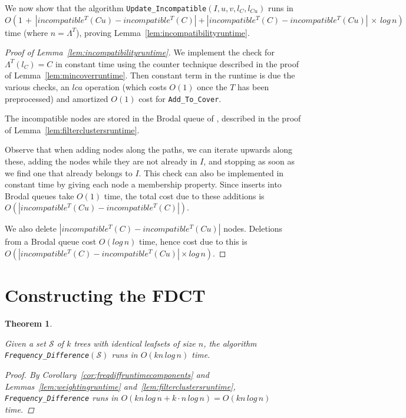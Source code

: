 \documentclass{article}
\newcommand{\leafset}{\Lambda}
\newtheorem{freqdiffruntime}[incompatibility]{Theorem}
\begin{document}
    We now show that the algorithm \texttt{Update\_Incompatible}$(I, u, v, l_C, l_{Cu})$ runs in $O(1\, +\, |incompatible^{T}(Cu) - incompatible^{T}(C)| + |incompatible^{T}(C) - incompatible^{T}(Cu)|\,\times\,log\,n)$ time (where $n = \leafset^{T}$), proving Lemma~\ref{lem:incompatibilityruntime}.

    \begin{proof}[Proof of Lemma~\ref{lem:incompatibilityruntime}]
        We implement the check for $\leafset^{T}(l_C) = C$ in constant time using the counter technique described in the proof of Lemma~\ref{lem:mincoverruntime}. Then constant term in the runtime is due the various checks, an $lca$ operation (which costs $O(1)$ once the $T$ has been preprocessed) and amortized $O(1)$ cost for \texttt{Add\_To\_Cover}.

        The incompatible nodes are stored in the Brodal queue of \cite{brodal1995fast}, described in the proof of Lemma~\ref{lem:filterclustersruntime}.

        Observe that when adding nodes along the paths, we can iterate upwards along these, adding the nodes while they are not already in $I$, and stopping as soon as we find one that already belongs to $I$. This check can also be implemented in constant time by giving each node a membership property. Since inserts into Brodal queues take $O(1)$ time, the total cost due to these additions is $O(|incompatible^{T}(Cu) - incompatible^{T}(C)|)$.

        We also delete $|incompatible^{T}(C) - incompatible^{T}(Cu)|$ nodes. Deletions from a Brodal queue cost $O(log\,n)$ time, hence cost due to this is $O(|incompatible^{T}(C) - incompatible^{T}(Cu)| \times log\,n)$.
    \end{proof}

    \section{Constructing the FDCT}
    \label{sec:freqdiffconstruction}

    \begin{freqdiffruntime}
        \label{theorem:freqdiffruntime}

        Given a set $\mathcal{S}$ of $k$ trees with identical leafsets of size $n$, the algorithm \texttt{Frequency\_Difference}$(\mathcal{S})$ runs in $O(kn\,log\,n)$ time.

        \begin{proof}
            By Corollary~\ref{cor:freqdiffruntimecomponents} and Lemmas~\ref{lem:weightingruntime} and~\ref{lem:filterclustersruntime}, \texttt{Frequency\_Difference} runs in $O(kn\,log\,n + k \cdot n\,log\,n) = O(kn\,log\,n)$ time.
        \end{proof}
    \end{freqdiffruntime}
\end{document}
